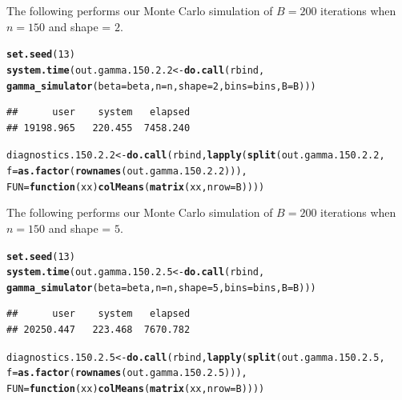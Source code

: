 \documentclass[11pt]{article}\usepackage[]{graphicx}\usepackage[]{color}
\makeatletter
\newcommand{\hlnum}[1]{\textcolor[rgb]{0.686,0.059,0.569}{#1}}%
\newcommand{\hlstd}[1]{\textcolor[rgb]{0.345,0.345,0.345}{#1}}%
\newcommand{\hlkwa}[1]{\textcolor[rgb]{0.161,0.373,0.58}{\textbf{#1}}}%
\newcommand{\hlkwb}[1]{\textcolor[rgb]{0.69,0.353,0.396}{#1}}%
\newcommand{\hlkwc}[1]{\textcolor[rgb]{0.333,0.667,0.333}{#1}}%
\newcommand{\hlkwd}[1]{\textcolor[rgb]{0.737,0.353,0.396}{\textbf{#1}}}%
\newenvironment{kframe}{%
 \def\at@end@of@kframe{}%
 \ifinner\ifhmode%
  \def\at@end@of@kframe{\end{minipage}}%
  \begin{minipage}{\columnwidth}%
 \fi\fi%
 \def\FrameCommand##1{\hskip\@totalleftmargin \hskip-\fboxsep
 \colorbox{shadecolor}{##1}\hskip-\fboxsep
     \hskip-\linewidth \hskip-\@totalleftmargin \hskip\columnwidth}%
 \MakeFramed {\advance\hsize-\width
   \@totalleftmargin\z@ \linewidth\hsize
   \@setminipage}}%
 {\par\unskip\endMakeFramed%
 \at@end@of@kframe}
\newenvironment{knitrout}{}{} %
\makeatother
\begin{document}
The following performs our Monte Carlo simulation of $B = 200$ iterations 
when $n = 150$ and shape = $2$.

\begin{knitrout}
\color{fgcolor}\begin{kframe}
\begin{alltt}
\hlkwd{set.seed}\hlstd{(}\hlnum{13}\hlstd{)}
\hlkwd{system.time}\hlstd{(out.gamma.150.2.2} \hlkwb{<-} \hlkwd{do.call}\hlstd{(rbind,}
  \hlkwd{gamma_simulator}\hlstd{(}\hlkwc{beta} \hlstd{= beta,} \hlkwc{n} \hlstd{= n,} \hlkwc{shape} \hlstd{=} \hlnum{2}\hlstd{,} \hlkwc{bins} \hlstd{= bins,} \hlkwc{B} \hlstd{= B)))}
\end{alltt}
\begin{verbatim}
##      user    system   elapsed 
## 19198.965   220.455  7458.240
\end{verbatim}
\begin{alltt}
\hlstd{diagnostics.150.2.2} \hlkwb{<-} \hlkwd{do.call}\hlstd{(rbind,} \hlkwd{lapply}\hlstd{(}\hlkwd{split}\hlstd{(out.gamma.150.2.2,}
  \hlkwc{f} \hlstd{=} \hlkwd{as.factor}\hlstd{(}\hlkwd{rownames}\hlstd{(out.gamma.150.2.2))),}
  \hlkwc{FUN} \hlstd{=} \hlkwa{function}\hlstd{(}\hlkwc{xx}\hlstd{)} \hlkwd{colMeans}\hlstd{(}\hlkwd{matrix}\hlstd{(xx,} \hlkwc{nrow} \hlstd{= B))))}
\end{alltt}
\end{kframe}
\end{knitrout}




The following performs our Monte Carlo simulation of $B = 200$ iterations 
when $n = 150$ and shape = $5$.

\begin{knitrout}
\color{fgcolor}\begin{kframe}
\begin{alltt}
\hlkwd{set.seed}\hlstd{(}\hlnum{13}\hlstd{)}
\hlkwd{system.time}\hlstd{(out.gamma.150.2.5} \hlkwb{<-} \hlkwd{do.call}\hlstd{(rbind,}
  \hlkwd{gamma_simulator}\hlstd{(}\hlkwc{beta} \hlstd{= beta,} \hlkwc{n} \hlstd{= n,} \hlkwc{shape} \hlstd{=} \hlnum{5}\hlstd{,} \hlkwc{bins} \hlstd{= bins,} \hlkwc{B} \hlstd{= B)))}
\end{alltt}
\begin{verbatim}
##      user    system   elapsed 
## 20250.447   223.468  7670.782
\end{verbatim}
\begin{alltt}
\hlstd{diagnostics.150.2.5} \hlkwb{<-} \hlkwd{do.call}\hlstd{(rbind,} \hlkwd{lapply}\hlstd{(}\hlkwd{split}\hlstd{(out.gamma.150.2.5,}
  \hlkwc{f} \hlstd{=} \hlkwd{as.factor}\hlstd{(}\hlkwd{rownames}\hlstd{(out.gamma.150.2.5))),}
  \hlkwc{FUN} \hlstd{=} \hlkwa{function}\hlstd{(}\hlkwc{xx}\hlstd{)} \hlkwd{colMeans}\hlstd{(}\hlkwd{matrix}\hlstd{(xx,} \hlkwc{nrow} \hlstd{= B))))}
\end{alltt}
\end{kframe}
\end{knitrout}
\end{document}
